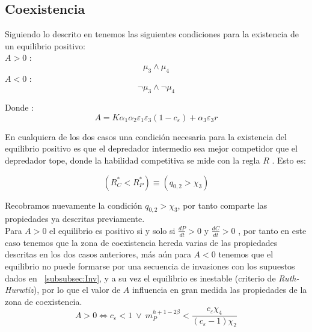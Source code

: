 \subsection{Coexistencia}
Siguiendo lo descrito en \cite{holt1997theoretical} tenemos las siguientes condiciones para la existencia de un equilibrio positivo:\\
$A >0$ :
\begin{equation}
  \mu_3 \land \mu_4
\end{equation}
$A <0$ :
\begin{equation}
  \lnot \mu_3 \land \lnot \mu_4
\end{equation}
 
Donde :
\begin{equation}
  A = K \alpha_1 \alpha_2 \varepsilon_1 \varepsilon_3(1-c_\varepsilon) + \alpha_3\varepsilon_3 r
\end{equation}

En cualquiera de los dos casos una condici\'on necesaria para la existencia del equilibrio positivo es que el depredador intermedio sea mejor competidor que el depredador tope, donde la habilidad competitiva se mide con la regla $R$ \citep{holt1997theoretical,Tilman1990}. Esto es:

\begin{equation}
  (R^*_C < R^*_P) \equiv (q_{0,2} > \chi_3)
\end{equation}

Recobramos nuevamente la condici\'on $q_{0,2} > \chi_3$, por tanto comparte las propiedades ya descritas previamente. \\


Para $A>0$ el equilibrio es positivo si y solo si $\frac{dP}{dt} >0 $ y $\frac{dC}{dt} >0$ , por tanto en este caso tenemos que la zona de coexistencia hereda varias de las propiedades descritas en los dos casos anteriores, m\'as a\'un para $A < 0$ tenemos que el equilibrio no puede formarse por una secuencia de invasiones con los supuestos dados en ~\ref{subsubsec:Inv}, y a su vez el equilibrio es inestable (criterio de \emph{Ruth-Hurwtiz}\citep{holt1997theoretical}), por lo que el valor de $A$ influencia en gran medida las propiedades de la zona de coexistencia.\\


\begin{equation}
  A > 0 \iff c_\varepsilon < 1 \  \lor \  m_P^{h + 1 - 2\beta} < \frac{c_\varepsilon \chi_4}{(c_\varepsilon - 1) \chi_2}
\end{equation}

